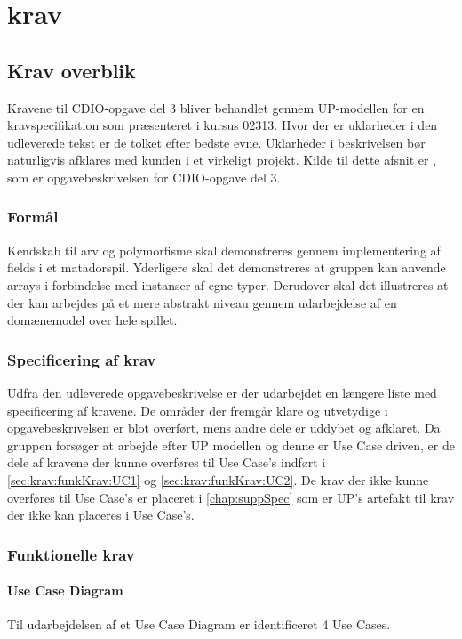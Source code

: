 \chapter{krav}\label{chap:krav}

\section{Krav overblik}\label{sec:krav:kravOverblik}
Kravene til CDIO-opgave del 3 bliver behandlet gennem UP-modellen for en kravspecifikation som præsenteret i kursus 02313. Hvor der er uklarheder i den udleverede tekst er de tolket efter bedste evne. Uklarheder i beskrivelsen bør naturligvis afklares med kunden i et virkeligt projekt. Kilde til dette afsnit er \cite{CDIOdel3}, som er opgavebeskrivelsen for CDIO-opgave del 3.

\subsection{Formål}\label{sec:krav:formål}
Kendskab til arv og polymorfisme skal demonstreres gennem implementering af fields i et matadorspil. Yderligere skal det demonstreres at gruppen kan anvende arrays i forbindelse med instanser af egne typer. Derudover skal det illustreres at der kan arbejdes på et mere abstrakt niveau gennem udarbejdelse af en domænemodel over hele spillet. 

\subsection{Specificering af krav}\label{sec:krav:kravSpec}
Udfra den udleverede opgavebeskrivelse \cite{CDIOdel3} er der udarbejdet en længere liste med specificering af kravene. De områder der fremgår klare og utvetydige i opgavebeskrivelsen er blot overført, mens andre dele er uddybet og afklaret. Da gruppen forsøger at arbejde efter UP modellen og denne er Use Case driven, er de dele af kravene der kunne overføres til Use Case's indført i \ref{sec:krav:funkKrav:UC1} og \ref{sec:krav:funkKrav:UC2}. De krav der ikke kunne overføres til Use Case's er placeret i \ref{chap:suppSpec} som er UP's artefakt til krav der ikke kan placeres i Use Case's.
 
\subsection{Funktionelle krav}\label{sec:krav:funkKrav}
\subsubsection{Use Case Diagram}\label{sec:krav:funkKrav:useCaseDia}
Til udarbejdelsen af et Use Case Diagram er identificeret 4 Use Cases. 

